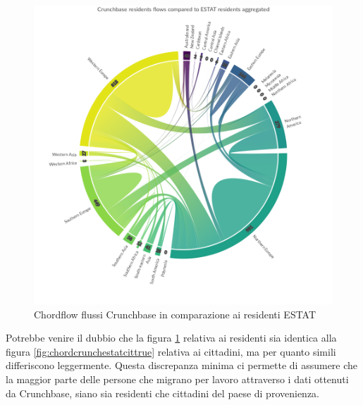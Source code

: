 \begin{figure}[t]
    \centering
    \includegraphics[width=1.0\textwidth]{images/ChordFlows/Crunchbase_res_ESTAT_True.png}
    \caption{Chordflow flussi Crunchbase in comparazione ai residenti ESTAT}
    \label{fig:chordcrunchestatrestrue}
\end{figure}
Potrebbe venire il dubbio che la figura \ref{fig:chordcrunchestatrestrue} relativa ai residenti sia identica alla figura \ref{fig:chordcrunchestatcittrue} relativa ai cittadini, ma per quanto simili differiscono leggermente. Questa discrepanza minima ci permette di assumere che la maggior parte delle persone che migrano per lavoro attraverso i dati ottenuti da Crunchbase, siano sia residenti che cittadini del paese di provenienza.
